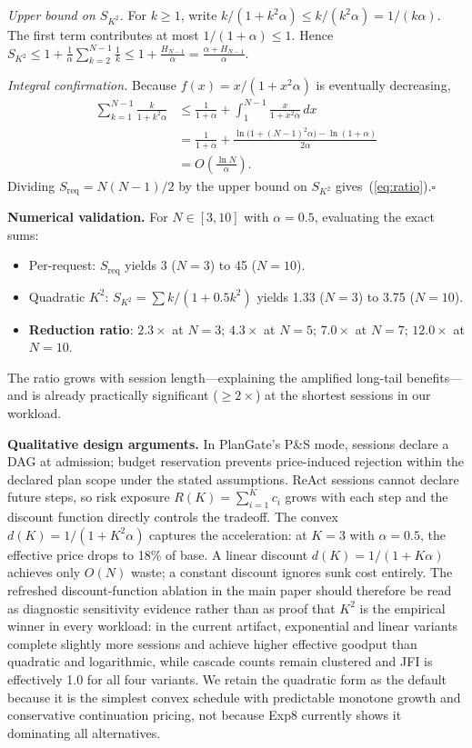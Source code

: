 \documentclass[sigconf,anonymous]{acmart}
\begin{document}
\emph{Upper bound on $S_{K^2}$.}
For $k\geq 1$, write $k/(1{+}k^2\alpha)\leq k/(k^2\alpha)=1/(k\alpha)$.
The first term contributes at most $1/(1{+}\alpha)\leq 1$.
Hence
$S_{K^2} \leq 1 + \frac{1}{\alpha}\sum_{k=2}^{N-1}\frac{1}{k}
       \leq 1 + \frac{H_{N-1}}{\alpha} = \frac{\alpha + H_{N-1}}{\alpha}$.

\emph{Integral confirmation.}
Because $f(x)=x/(1{+}x^2\alpha)$ is eventually decreasing,
\begin{align*}
\sum_{k=1}^{N-1}\frac{k}{1{+}k^2\alpha}
  &\leq \frac{1}{1{+}\alpha}+\int_{1}^{N-1}\!\frac{x}{1{+}x^2\alpha}\,dx \\
  &= \frac{1}{1{+}\alpha}+\frac{\ln\bigl(1{+}(N{-}1)^2\alpha\bigr)-\ln(1{+}\alpha)}{2\alpha} \\
  &= O\!\left(\frac{\ln N}{\alpha}\right).
\end{align*}
Dividing $S_{\text{req}}=N(N{-}1)/2$ by the upper bound on $S_{K^2}$ gives~(\ref{eq:ratio}).\hfill$\square$

\textbf{Numerical validation.}
For $N\in[3,10]$ with $\alpha{=}0.5$, evaluating the exact sums:
\begin{itemize}[nosep,leftmargin=*]
  \item Per-request: $S_{\text{req}}$ yields 3 ($N{=}3$) to 45 ($N{=}10$).
  \item Quadratic $K^2$: $S_{K^2}=\sum k/(1{+}0.5k^2)$ yields 1.33 ($N{=}3$) to 3.75 ($N{=}10$).
  \item \textbf{Reduction ratio}: $2.3\times$ at $N{=}3$; $4.3\times$ at $N{=}5$; $7.0\times$ at $N{=}7$; $12.0\times$ at $N{=}10$.
\end{itemize}
The ratio grows with session length---explaining the amplified long-tail benefits---and is already practically significant ($\geq 2\times$) at the shortest sessions in our workload.

\textbf{Qualitative design arguments.}
In PlanGate's P\&S mode, sessions declare a DAG at admission; budget reservation prevents price-induced rejection within the declared plan scope under the stated assumptions. ReAct sessions cannot declare future steps, so risk exposure $R(K) = \sum_{i=1}^{K} c_i$ grows with each step and the discount function directly controls the tradeoff. The convex $d(K)=1/(1+K^2\alpha)$ captures the acceleration: at $K{=}3$ with $\alpha{=}0.5$, the effective price drops to 18\% of base. A linear discount $d(K)=1/(1+K\alpha)$ achieves only $O(N)$ waste; a constant discount ignores sunk cost entirely. The refreshed discount-function ablation in the main paper should therefore be read as diagnostic sensitivity evidence rather than as proof that $K^2$ is the empirical winner in every workload: in the current artifact, exponential and linear variants complete slightly more sessions and achieve higher effective goodput than quadratic and logarithmic, while cascade counts remain clustered and JFI is effectively 1.0 for all four variants. We retain the quadratic form as the default because it is the simplest convex schedule with predictable monotone growth and conservative continuation pricing, not because Exp8 currently shows it dominating all alternatives.
\end{document}
